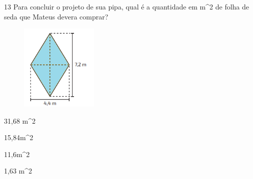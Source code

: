 





\num{13} Para concluir o projeto de sua pipa, qual é a quantidade em m^2 de
folha de seda que Mateus devera comprar?

\begin{figure}[H]
\centering\includegraphics[width=1.45833in,height=1.63333in]{./imgSAEB_8_MAT/media/image59.png}
\end{figure}
\item 31,68 m^2
\item 15,84m^2
\item 11,6m^2
\item 1,63 m^2








